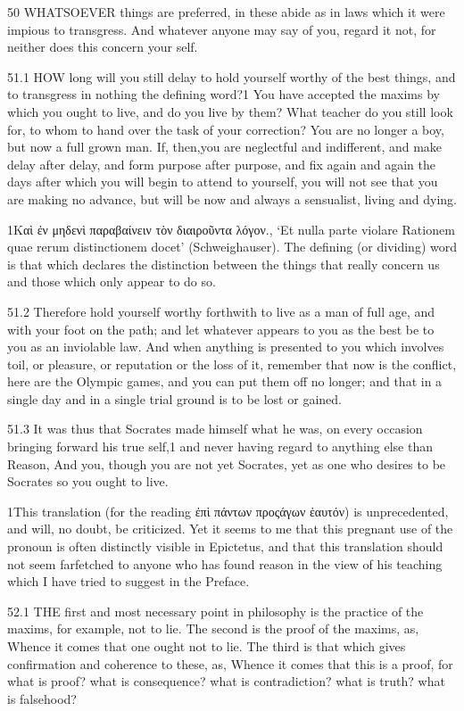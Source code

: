     50   WHATSOEVER things are preferred, in these abide as in laws which it were impious to transgress. And whatever anyone may say of you, regard it not, for neither does this concern your self.

    51.1   HOW long will you still delay to hold yourself worthy of the best things, and to transgress in nothing the defining word?1 You have accepted the maxims by which you ought to live, and do you live by them? What teacher do you still look for, to whom to hand over the task of your correction? You are no longer a boy, but now a full grown man.  If, then,you are neglectful and indifferent, and make delay after delay, and form purpose after purpose, and fix again and again the days after which you will begin to attend to yourself, you will not see that you are making no advance, but will be now and always a sensualist, living and dying.

    1Καὶ ἐν μηδενὶ παραβαίνειν τὸν διαιροῦντα λόγον., ‘Et nulla parte violare Rationem quae rerum distinctionem docet’ (Schweighauser). The defining (or dividing) word is that which declares the distinction between the things that really concern us and those which only appear to do so.

    51.2   Therefore hold yourself worthy forthwith to live as a man of full age, and with your foot on the path; and let whatever appears to you as the best be to you as an inviolable law. And when anything is presented to you which involves toil, or pleasure, or reputation or the loss of it, remember that now is the conflict, here are the Olympic games, and you can put them off no longer; and that in a single day and in a single trial ground is to be lost or gained.

    51.3   It was thus that Socrates made himself what he was, on every occasion bringing forward his true self,1 and never having regard to anything else than Reason, And you, though you are not yet Socrates, yet as one who desires to be Socrates so you ought to live.

    1This translation (for the reading ἐπὶ πάντων προςάγων ἑαυτόν) is unprecedented, and will, no doubt, be criticized. Yet it seems to me that this pregnant use of the pronoun is often distinctly visible in Epictetus, and that this translation should not seem farfetched to anyone who has found reason in the view of his teaching which I have tried to suggest in the Preface.

    52.1   THE first and most necessary point in philosophy is the practice of the maxims, for example, not to lie. The second is the proof of the maxims, as, Whence it comes that one ought not to lie. The third is that which gives confirmation and coherence to these, as, Whence it comes that this is a proof, for what is proof? what is consequence? what is contradiction? what is truth? what is falsehood?

